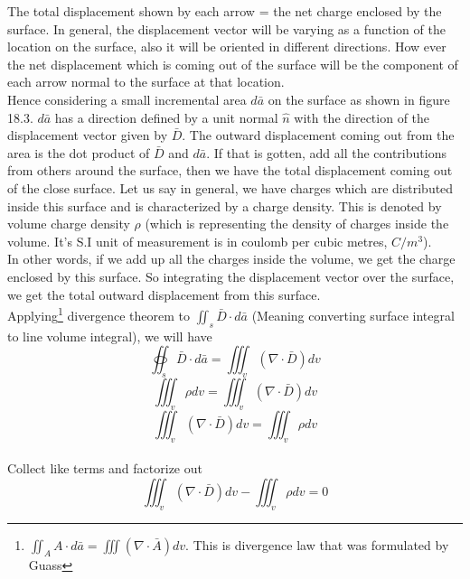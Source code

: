 The total displacement shown by each arrow = the net charge enclosed by the surface. In general, the displacement vector will be varying as a function of the location on the surface, also it will be oriented in different directions. How ever the net displacement which is coming out of the surface will be the component of each arrow normal to the surface at that location. \\

Hence considering a small incremental area $ d\bar{a} $ on the surface as shown in figure 18.3. $ d\bar{a} $ has a direction defined by a unit normal $ \hat{n} $ with the direction of the displacement vector given by $ \bar{D} $. The outward displacement coming out from the area is the dot product of $ \bar{D} $ and $ d\bar{a} $. If that is gotten, add all the contributions from others around the surface, then we have the total displacement coming out of the close surface. Let us say in general, we have charges which are distributed inside this surface and is characterized by a charge density. This is denoted by volume charge density $ \rho $ (which is representing the density of charges inside the volume. It's S.I unit of measurement is in coulomb per cubic metres, $ C/m^{3} $). \\

In other words, if we add up all the charges inside the volume, we get the charge enclosed by this surface. So integrating the displacement vector over the surface, we get the total outward displacement from this surface. \\

Applying\footnote[6]{$	\iint_A A\cdot d\bar{a} = \iiint (\nabla\cdot \bar{A})dv $. This is divergence law that was formulated by Guass} divergence theorem to  $\iint_s\bar{D}\cdot d\bar{a}$ (Meaning converting surface integral to line volume integral), we will have \\

\begin{equation*}
\oiint_s\bar{D} \cdot d\bar{a} = \iiint_v(\nabla\cdot \bar{D})dv
\end{equation*}
\begin{equation*}
\iiint_v\rho dv = \iiint_v(\nabla\cdot \bar{D})dv
\end{equation*}
\begin{equation*}
\iiint_v(\nabla\cdot \bar{D})dv = \iiint_v\rho dv
\end{equation*} \\

Collect like terms and factorize out\\
\begin{equation*}
\iiint_v(\nabla\cdot \bar{D})dv - \iiint_v\rho dv = 0
\end{equation*}

